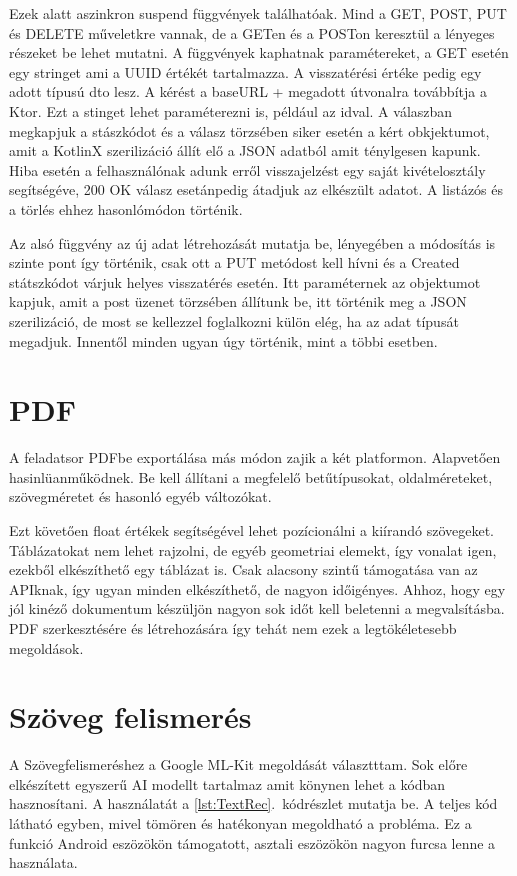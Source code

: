 Ezek alatt aszinkron suspend függvények találhatóak. Mind a GET, POST, PUT és DELETE műveletkre vannak, de a GETen és a POSTon keresztül a lényeges részeket be lehet mutatni.
A függvények kaphatnak paramétereket, a GET esetén egy stringet ami a UUID értékét tartalmazza.
A visszatérési értéke pedig egy adott típusú dto lesz.
A kérést a baseURL + megadott útvonalra továbbítja a Ktor. Ezt a stinget lehet paraméterezni is, például az idval.
A válaszban megkapjuk a stászkódot és a válasz törzsében siker esetén a kért obkjektumot, amit a KotlinX szerilizáció állít elő a JSON adatból amit ténylgesen kapunk.
Hiba esetén a felhasználónak adunk erről visszajelzést egy saját kivételosztály segítségéve, 200 OK válasz esetánpedig átadjuk az elkészült adatot.
A listázós és a törlés ehhez hasonlómódon történik.

Az alsó függvény az új adat létrehozását mutatja be, lényegében a módosítás is szinte pont így történik, csak ott a PUT metódost kell hívni és a Created státszkódot várjuk helyes visszatérés esetén.
Itt paraméternek az objektumot kapjuk, amit a post üzenet törzsében állítunk be, itt történik meg a JSON szerilizáció, de most se kellezzel foglalkozni külön elég, ha az adat típusát megadjuk.
Innentől minden ugyan úgy történik, mint a többi esetben.


\section{PDF}
\label{sec:PDF}

A feladatsor PDFbe exportálása más módon zajik a két platformon. 
Alapvetően hasinlüanműködnek.
Be kell állítani a megfelelő betűtípusokat, oldalméreteket, szövegméretet és hasonló egyéb változókat.

Ezt követően float értékek segítségével lehet pozícionálni a kiírandó szövegeket.
Táblázatokat nem lehet rajzolni, de egyéb geometriai elemekt, így vonalat igen, ezekből elkészíthető egy táblázat is.
Csak alacsony szintű támogatása van az APIknak, így ugyan minden elkészíthető, de nagyon időigényes.
Ahhoz, hogy egy jól kinéző dokumentum készüljön nagyon sok időt kell beletenni a megvalsításba.
PDF szerkesztésére és létrehozására így tehát nem ezek a legtökéletesebb megoldások.

\section{Szöveg felismerés}
\label{sec:TextRec}

A Szövegfelismeréshez a Google ML-Kit megoldását választttam.
Sok előre elkészített egyszerű AI modellt tartalmaz amit könynen lehet a kódban hasznosítani.
A használatát a \ref{lst:TextRec}.~kódrészlet mutatja be. 
A teljes kód látható egyben, mivel tömören és hatékonyan megoldható a probléma.
Ez a funkció Android eszözökön támogatott, asztali eszözökön nagyon furcsa lenne a használata.


